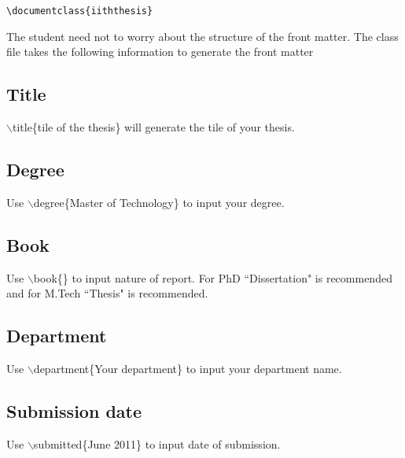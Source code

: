 \documentclass[a4paper,twoside]{iiththesis}
\begin{document}
\begin{verbatim}
\documentclass{iiththesis}
\end{verbatim}
The student need not to worry about the structure of the front matter. The class file takes the following information to generate the front matter

\subsection{Title}
$ \backslash $title\{tile of the thesis\} will generate the tile of your thesis.

\subsection{Degree}
Use $ \backslash $degree\{Master of Technology\} to input your degree.

\subsection{Book}
Use $ \backslash $book\{\} to input nature of report. For PhD ``Dissertation" is recommended and
for M.Tech ``Thesis" is recommended.

\subsection{Department}
Use $ \backslash $department\{Your department\} to input your department name.

\subsection{Submission date}
Use $ \backslash $submitted\{June 2011\} to input date of submission.
\end{document}
